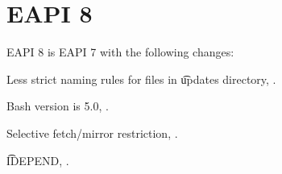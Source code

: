 \section{EAPI 8}

EAPI 8 is EAPI 7 with the following changes:

\begin{compactitem}
\item Less strict naming rules for files in \t{updates} directory, .
\item Bash version is 5.0, .
\item Selective fetch/mirror restriction, .
\item \t{IDEPEND}, .
\end{compactitem}



